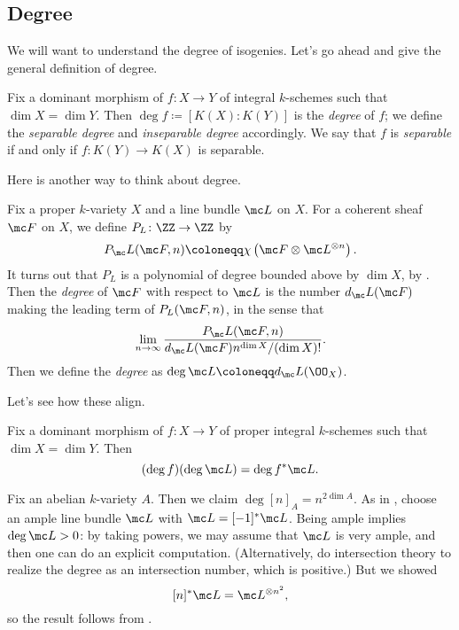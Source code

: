\documentclass[../notes.tex]{subfiles}
\begin{document}
\subsection{Degree}
We will want to understand the degree of isogenies. Let's go ahead and give the general definition of degree.
\begin{definition}[degree]
	Fix a dominant morphism of $f\colon X\to Y$ of integral $k$-schemes such that $\dim X=\dim Y$. Then $\deg f\coloneqq[K(X):K(Y)]$ is the \textit{degree} of $f$; we define the \textit{separable degree} and \textit{inseparable degree} accordingly. We say that $f$ is \textit{separable} if and only if $f\colon K(Y)\to K(X)$ is separable.
\end{definition}
Here is another way to think about degree.
\begin{definition}[degree]
	Fix a proper $k$-variety $X$ and a line bundle $\mc L$ on $X$. For a coherent sheaf $\mc F$ on $X$, we define $P_L\colon\ZZ\to\ZZ$ by
	\[P_\mc L(\mc F,n)\coloneqq\chi\left(\mc F\otimes\mc L^{\otimes n}\right).\]
	It turns out that $P_L$ is a polynomial of degree bounded above by $\dim X$, by \cite[Theorem~19.6.1]{rising-sea}. Then the \textit{degree} of $\mc F$ with respect to $\mc L$ is the number $d_\mc L(\mc F)$ making the leading term of $P_L(\mc F,n)$, in the sense that
	\[\lim_{n\to\infty}\frac{P_\mc L(\mc F,n)}{d_\mc L(\mc F)n^{\dim X}/(\dim X)!}.\]
	Then we define the \textit{degree} as $\deg\mc L\coloneqq d_\mc L(\OO_X)$.
\end{definition}
Let's see how these align.
\begin{proposition} \label{prop:deg-of-pullback}
	Fix a dominant morphism of $f\colon X\to Y$ of proper integral $k$-schemes such that $\dim X=\dim Y$. Then
	\[(\deg f)(\deg\mc L)=\deg f^*\mc L.\]
\end{proposition}
\begin{example}
	Fix an abelian $k$-variety $A$. Then we claim $\deg[n]_A=n^{2\dim A}$. As in , choose an ample line bundle $\mc L$ with $\mc L=[-1]^*\mc L$. Being ample implies $\deg\mc L>0$: by taking powers, we may assume that $\mc L$ is very ample, and then one can do an explicit computation. (Alternatively, do intersection theory to realize the degree as an intersection number, which is positive.) But we showed
	\[[n]^*\mc L=\mc L^{\otimes n^2},\]
	so the result follows from .
\end{example}
\end{document}
